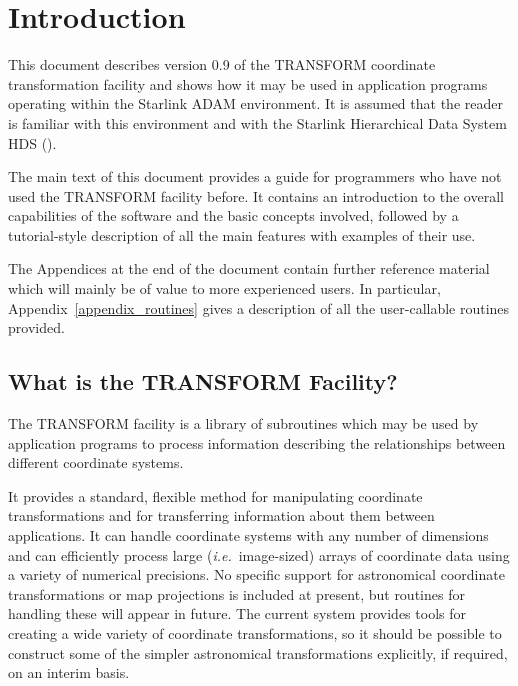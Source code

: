 \documentclass[twoside,nolof,11pt]{starlink}
\providecommand{\name}[1]{\small{#1}}
\begin{document}
\scfrontmatter

\section{Introduction}

This document describes version 0.9 of the \name{TRANSFORM} coordinate
transformation facility and shows how it may be used in application programs
operating within the Starlink \name{ADAM} environment.
It is assumed that the reader is familiar with this environment and with the
Starlink Hierarchical Data System \name{HDS} ().

The main text of this document provides a guide for programmers who have not
used the \name{TRANSFORM} facility before.
It contains an introduction to the overall capabilities of the software and
the basic concepts involved, followed by a tutorial-style description of all
the main features with examples of their use.

The Appendices at the end of the document contain further reference material
which will mainly be of value to more experienced users.
In particular, Appendix~\ref{appendix_routines} gives a description of all
the user-callable routines provided.


\subsection{What is the \name{TRANSFORM} Facility?}

The \name{TRANSFORM} facility is a library of subroutines which may be used
by application programs to process information describing the relationships
between different coordinate systems.

It provides a standard, flexible method for manipulating coordinate
transformations and for transferring information about them between
applications.
It can handle coordinate systems with any number of dimensions and can
efficiently process large (\emph{i.e.}\ image-sized) arrays of coordinate
data using a variety of numerical precisions.
No specific support for astronomical coordinate transformations or map
projections is included at present, but routines for handling these will
appear in future.
The current system provides tools for creating a wide variety of coordinate
transformations, so it should be possible to construct some of the simpler
astronomical transformations explicitly, if required, on an interim basis.
\end{document}
